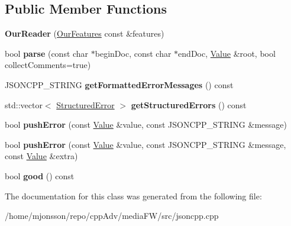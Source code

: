 \subsection*{Public Member Functions}
\begin{DoxyCompactItemize}
\item 
\mbox{\label{classJson_1_1OurReader_a48a850914b9c8d7781be172930c478e5}} 
{\bfseries Our\+Reader} (\hyperlink{classJson_1_1OurFeatures}{Our\+Features} const \&features)
\item 
\mbox{\label{classJson_1_1OurReader_aba4f8749aab7f02ec17f107e392caf80}} 
bool {\bfseries parse} (const char $\ast$begin\+Doc, const char $\ast$end\+Doc, \hyperlink{classJson_1_1Value}{Value} \&root, bool collect\+Comments=true)
\item 
\mbox{\label{classJson_1_1OurReader_a7971de51d73bb4aee5b0c4742c4aaaac}} 
J\+S\+O\+N\+C\+P\+P\+\_\+\+S\+T\+R\+I\+NG {\bfseries get\+Formatted\+Error\+Messages} () const
\item 
\mbox{\label{classJson_1_1OurReader_a0eb2420a6bef89a3f3256191e6e3de6d}} 
std\+::vector$<$ \hyperlink{structJson_1_1OurReader_1_1StructuredError}{Structured\+Error} $>$ {\bfseries get\+Structured\+Errors} () const
\item 
\mbox{\label{classJson_1_1OurReader_a700e9d8e0977fa7e0375d26690d7025f}} 
bool {\bfseries push\+Error} (const \hyperlink{classJson_1_1Value}{Value} \&value, const J\+S\+O\+N\+C\+P\+P\+\_\+\+S\+T\+R\+I\+NG \&message)
\item 
\mbox{\label{classJson_1_1OurReader_addccecfca74b79adaad6115ddd614477}} 
bool {\bfseries push\+Error} (const \hyperlink{classJson_1_1Value}{Value} \&value, const J\+S\+O\+N\+C\+P\+P\+\_\+\+S\+T\+R\+I\+NG \&message, const \hyperlink{classJson_1_1Value}{Value} \&extra)
\item 
\mbox{\label{classJson_1_1OurReader_a63c7d874fa379397e0a5fa65f0843845}} 
bool {\bfseries good} () const
\end{DoxyCompactItemize}


The documentation for this class was generated from the following file\+:\begin{DoxyCompactItemize}
\item 
/home/mjonsson/repo/cpp\+Adv/media\+F\+W/src/jsoncpp.\+cpp\end{DoxyCompactItemize}
